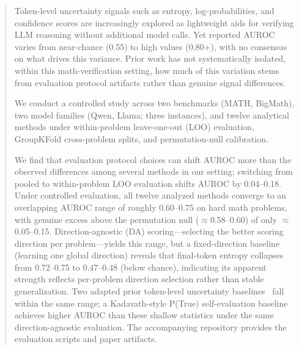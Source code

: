 \documentclass{article}
\begin{document}


\begin{abstract}
Token-level uncertainty signals such as entropy, log-probabilities, and confidence scores are increasingly explored as lightweight aids for verifying LLM reasoning without additional model calls. Yet reported AUROC varies from near-chance (0.55) to high values (0.80+), with no consensus on what drives this variance. Prior work has not systematically isolated, within this math-verification setting, how much of this variation stems from evaluation protocol artifacts rather than genuine signal differences.

We conduct a controlled study across two benchmarks (MATH, BigMath), two model families (Qwen, Llama; three instances), and twelve analytical methods under within-problem leave-one-out (LOO) evaluation, GroupKFold cross-problem splits, and permutation-null calibration.

We find that evaluation protocol choices can shift AUROC more than the observed differences among several methods in our setting; switching from pooled to within-problem LOO evaluation shifts AUROC by 0.04--0.18. Under controlled evaluation, all twelve analyzed methods converge to an overlapping AUROC range of roughly 0.60--0.75 on hard math problems, with genuine excess above the permutation null ($\approx$0.58--0.60) of only $\approx$0.05--0.15. Direction-agnostic (DA) scoring---selecting the better scoring direction per problem---yields this range, but a fixed-direction baseline (learning one global direction) reveals that final-token entropy collapses from 0.72--0.75 to 0.47--0.48 (below chance), indicating its apparent strength reflects per-problem direction selection rather than stable generalization. Two adapted prior token-level uncertainty baselines~\cite{wang2025eat,malinin2021uncertainty} fall within the same range; a Kadavath-style P(True) self-evaluation baseline~\cite{kadavath2022language} achieves higher AUROC than these shallow statistics under the same direction-agnostic evaluation. The accompanying repository provides the evaluation scripts and paper artifacts.
\end{abstract}
\end{document}
